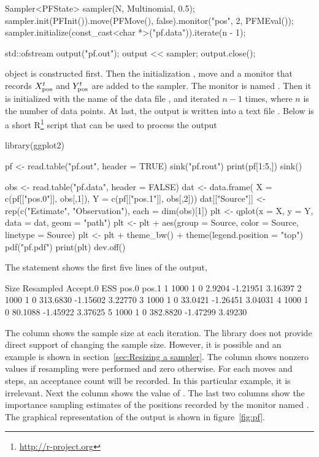 \begin{cppcode}
    Sampler<PFState> sampler(N, Multinomial, 0.5);
    sampler.init(PFInit()).move(PFMove(), false).monitor("pos", 2, PFMEval());
    sampler.initialize(const_cast<char *>("pf.data")).iterate(n - 1);

    std::ofstream output("pf.out");
    output << sampler;
    output.close();
\end{cppcode}
 object is constructed first. Then the
initialization , move  and a monitor
 that records $X_{\mathrm{pos}}^t$ and $Y_{\mathrm{pos}}^t$ are added to the
sampler. The monitor is named . Then it is initialized with
the name of the data file , and iterated $n - 1$ times,
where $n$ is the number of data points. At last, the output is written into a
text file . Below is a short
R\footnote{\url{http://r-project.org}} script that can be used to process the
output
\begin{rcode}
  library(ggplot2)

  pf <- read.table("pf.out", header = TRUE)
  sink("pf.rout")
  print(pf[1:5,])
  sink()

  obs <- read.table("pf.data", header = FALSE)
  dat <- data.frame(
  X = c(pf[["pos.0"]], obs[,1]),
  Y = c(pf[["pos.1"]], obs[,2]))
  dat[["Source"]] <- rep(c("Estimate", "Observation"), each = dim(obs)[1])
  plt <- qplot(x = X, y = Y, data = dat, geom = "path")
  plt <- plt + aes(group = Source, color = Source, linetype = Source)
  plt <- plt + theme_bw() + theme(legend.position = "top")
  pdf("pf.pdf")
  print(plt)
  dev.off()
\end{rcode}

The  statement shows the first five lines of the output,
\begin{textcode}
    Size Resampled Accept.0      ESS    pos.0   pos.1
  1 1000         1        0   2.9204 -1.21951 3.16397
  2 1000         1        0 313.6830 -1.15602 3.22770
  3 1000         1        0  33.0421 -1.26451 3.04031
  4 1000         1        0  80.1088 -1.45922 3.37625
  5 1000         1        0 382.8820 -1.47299 3.49230
\end{textcode}
The column  shows the sample size at each iteration. The
library does not provide direct support of changing the sample size. However,
it is possible and an example is shown in section~\ref{sec:Resizing a sampler}.
The column  shows nonzero values if resampling were
performed and zero otherwise. For each moves and \mcmc steps, an acceptance
count will be recorded. In this particular example, it is irrelevant. Next the
column  shows the value of \ess. The last two columns show the
importance sampling estimates of the positions recorded by the monitor named
. The graphical representation of the output is shown in
figure~\ref{fig:pf}.

